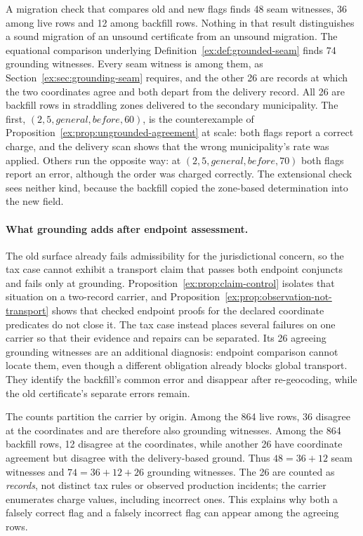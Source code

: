 \documentclass[twocolumn,envcountsect,envcountsame,natbib]{svjour3}
\begin{document}
A migration check that compares old and new flags finds 48 seam witnesses, 36 among live rows and 12 among backfill rows. Nothing in that result distinguishes a sound migration of an unsound certificate from an unsound migration. The equational comparison underlying Definition~\ref{ex:def:grounded-seam} finds 74 grounding witnesses. Every seam witness is among them, as Section~\ref{ex:sec:grounding-seam} requires, and the other 26 are records at which the two coordinates agree and both depart from the delivery record. All 26 are backfill rows in straddling zones delivered to the secondary municipality. The first, $(2,5,\mathit{general},\mathit{before},60)$, is the counterexample of Proposition~\ref{ex:prop:ungrounded-agreement} at scale: both flags report a correct charge, and the delivery scan shows that the wrong municipality's rate was applied. Others run the opposite way: at $(2,5,\mathit{general},\mathit{before},70)$ both flags report an error, although the order was charged correctly. The extensional check sees neither kind, because the backfill copied the zone-based determination into the new field.

\paragraph{What grounding adds after endpoint assessment.}
The old surface already fails admissibility for the jurisdictional concern, so the tax case cannot exhibit a transport claim that passes both endpoint conjuncts and fails only at grounding. Proposition~\ref{ex:prop:claim-control} isolates that situation on a two-record carrier, and Proposition~\ref{ex:prop:observation-not-transport} shows that checked endpoint proofs for the declared coordinate predicates do not close it. The tax case instead places several failures on one carrier so that their evidence and repairs can be separated. Its 26 agreeing grounding witnesses are an additional diagnosis: endpoint comparison cannot locate them, even though a different obligation already blocks global transport. They identify the backfill's common error and disappear after re-geocoding, while the old certificate's separate errors remain.

The counts partition the carrier by origin. Among the 864 live rows, 36 disagree at the coordinates and are therefore also grounding witnesses. Among the 864 backfill rows, 12 disagree at the coordinates, while another 26 have coordinate agreement but disagree with the delivery-based ground. Thus $48=36+12$ seam witnesses and $74=36+12+26$ grounding witnesses. The 26 are counted as \emph{records}, not distinct tax rules or observed production incidents; the carrier enumerates charge values, including incorrect ones. This explains why both a falsely correct flag and a falsely incorrect flag can appear among the agreeing rows.
\end{document}
